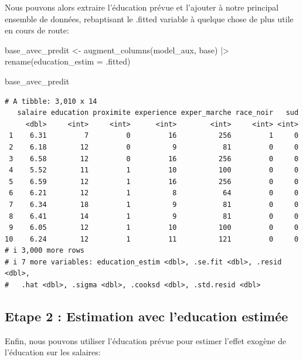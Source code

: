 \documentclass[
  letterpaper,
  DIV=11,
  numbers=noendperiod]{scrartcl}
\newenvironment{Shaded}{\begin{snugshade}}{\end{snugshade}}
\newcommand{\AttributeTok}[1]{\textcolor[rgb]{0.40,0.45,0.13}{#1}}
\newcommand{\FunctionTok}[1]{\textcolor[rgb]{0.28,0.35,0.67}{#1}}
\newcommand{\NormalTok}[1]{\textcolor[rgb]{0.00,0.23,0.31}{#1}}
\newcommand{\OtherTok}[1]{\textcolor[rgb]{0.00,0.23,0.31}{#1}}
\newcommand{\SpecialCharTok}[1]{\textcolor[rgb]{0.37,0.37,0.37}{#1}}
\begin{document}
Nous pouvons alors extraire l'éducation prévue et l'ajouter à notre
principal ensemble de données, rebaptisant le .fitted variable à quelque
chose de plus utile en cours de route:

\begin{Shaded}
\begin{Highlighting}[]
\NormalTok{base\_avec\_predit }\OtherTok{\textless{}{-}} \FunctionTok{augment\_columns}\NormalTok{(model\_aux, base) }\SpecialCharTok{|\textgreater{}}
  \FunctionTok{rename}\NormalTok{(}\AttributeTok{education\_estim =}\NormalTok{ .fitted)}
\end{Highlighting}
\end{Shaded}

\begin{Shaded}
\begin{Highlighting}[]
\NormalTok{base\_avec\_predit}
\end{Highlighting}
\end{Shaded}

\begin{verbatim}
# A tibble: 3,010 x 14
   salaire education proximite experience exper_marche race_noir   sud
     <dbl>     <int>     <int>      <int>        <int>     <int> <int>
 1    6.31         7         0         16          256         1     0
 2    6.18        12         0          9           81         0     0
 3    6.58        12         0         16          256         0     0
 4    5.52        11         1         10          100         0     0
 5    6.59        12         1         16          256         0     0
 6    6.21        12         1          8           64         0     0
 7    6.34        18         1          9           81         0     0
 8    6.41        14         1          9           81         0     0
 9    6.05        12         1         10          100         0     0
10    6.24        12         1         11          121         0     0
# i 3,000 more rows
# i 7 more variables: education_estim <dbl>, .se.fit <dbl>, .resid <dbl>,
#   .hat <dbl>, .sigma <dbl>, .cooksd <dbl>, .std.resid <dbl>
\end{verbatim}

\subsection{Etape 2 : Estimation avec l'education
estimée}\label{etape-2-estimation-avec-leducation-estimuxe9e}

Enfin, nous pouvons utiliser l'éducation prévue pour estimer l'effet
exogène de l'éducation sur les salaires:
\end{document}
